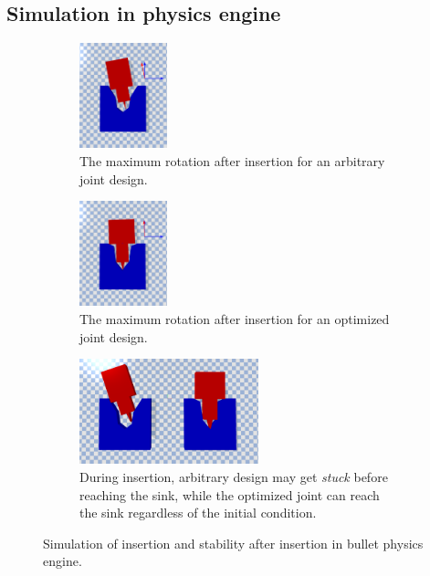 \documentclass[letterpaper, 10 pt, conference]{ieeeconf}
\begin{document}
\subsection{Simulation in physics engine}



\begin{figure}[t]
\begin{center}
\begin{subfigure}[t]{0.23\textwidth}
\begin{center}
\includegraphics[height=1.2in]{figures/initial_max_rotate.png}
\end{center}
\caption{The maximum rotation after insertion for an arbitrary joint design. }
\label{fig:initial_max}
\end{subfigure}
\begin{subfigure}[t]{0.23\textwidth}
\begin{center}
\includegraphics[height=1.2in]{figures/optimal_max_rotate.png}
\end{center}
\caption{The maximum rotation after insertion for an optimized joint design. }
\label{fig:optimal_max}
\end{subfigure}
\begin{subfigure}[t]{0.44\textwidth}
\begin{center}
\includegraphics[height=1.2in]{figures/stuck.png}
\end{center}
\caption{During insertion, arbitrary design may get {\em stuck} before reaching the sink, while the optimized joint can reach the sink regardless of the initial condition. }
\label{fig:stuck}
\end{subfigure}
\caption{Simulation of insertion and stability after insertion in bullet physics engine. }
\label{fig:simulation}
\end{center}
\end{figure}
\end{document}
